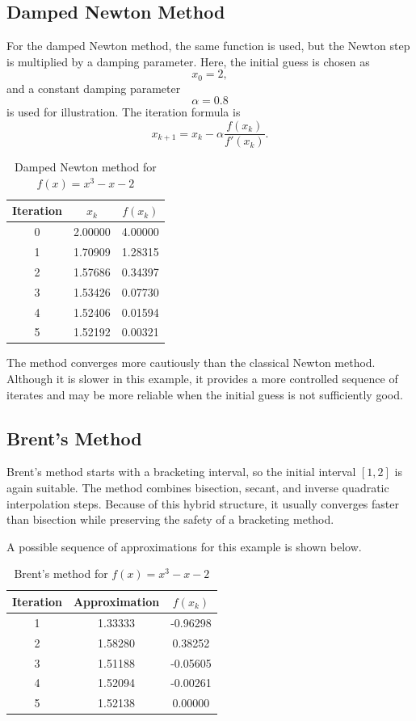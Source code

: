 \subsection{Damped Newton Method}

For the damped Newton method, the same function is used, but the Newton step is multiplied by a damping parameter. Here, the initial guess is chosen as
\[
x_0=2,
\]
and a constant damping parameter
\[
\alpha=0.8
\]
is used for illustration. The iteration formula is
\[
x_{k+1}=x_k-\alpha \frac{f(x_k)}{f'(x_k)}.
\]

\begin{table}[h!]
\centering
\caption{Damped Newton method for \(f(x)=x^3-x-2\)}
\label{tab:damped_newton_example}
\begin{tabular}{|c|c|c|}
\hline
Iteration & \(x_k\) & \(f(x_k)\) \\ \hline
0 & 2.00000 & 4.00000 \\ \hline
1 & 1.70909 & 1.28315 \\ \hline
2 & 1.57686 & 0.34397 \\ \hline
3 & 1.53426 & 0.07730 \\ \hline
4 & 1.52406 & 0.01594 \\ \hline
5 & 1.52192 & 0.00321 \\ \hline
\end{tabular}
\end{table}

The method converges more cautiously than the classical Newton method. Although it is slower in this example, it provides a more controlled sequence of iterates and may be more reliable when the initial guess is not sufficiently good.

\subsection{Brent's Method}

Brent's method starts with a bracketing interval, so the initial interval \([1,2]\) is again suitable. The method combines bisection, secant, and inverse quadratic interpolation steps. Because of this hybrid structure, it usually converges faster than bisection while preserving the safety of a bracketing method.

A possible sequence of approximations for this example is shown below.

\begin{table}[h!]
\centering
\caption{Brent's method for \(f(x)=x^3-x-2\)}
\label{tab:brent_example}
\begin{tabular}{|c|c|c|}
\hline
Iteration & Approximation & \(f(x_k)\) \\ \hline
1 & 1.33333 & -0.96298 \\ \hline
2 & 1.58280 & 0.38252 \\ \hline
3 & 1.51188 & -0.05605 \\ \hline
4 & 1.52094 & -0.00261 \\ \hline
5 & 1.52138 & 0.00000 \\ \hline
\end{tabular}
\end{table}

